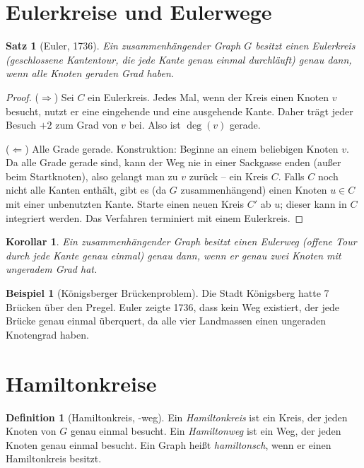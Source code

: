 ﻿\documentclass[a4paper,12pt,openany,oneside]{book}
\theoremstyle{definition}
\newtheorem{definition}{Definition}[chapter]
\newtheorem{beispiel}{Beispiel}[chapter]
\theoremstyle{plain}
\newtheorem{satz}{Satz}[chapter]
\newtheorem{korollar}{Korollar}[chapter]
\theoremstyle{remark}
\begin{document}
\section{Eulerkreise und Eulerwege}

\begin{satz}[Euler, 1736]
  Ein zusammenh\"angender Graph $G$ besitzt einen \emph{Eulerkreis}
  (geschlossene Kantentour, die jede Kante genau einmal durchl\"auft)
  genau dann, wenn alle Knoten geraden Grad haben.
\end{satz}

\begin{proof}
  ($\Rightarrow$) Sei $C$ ein Eulerkreis. Jedes Mal, wenn der Kreis einen
  Knoten $v$ besucht, nutzt er eine eingehende und eine ausgehende Kante.
  Daher tr\"agt jeder Besuch $+2$ zum Grad von $v$ bei. Also ist $\deg(v)$
  gerade.

  ($\Leftarrow$) Alle Grade gerade. Konstruktion: Beginne an einem beliebigen
  Knoten $v$. Da alle Grade gerade sind, kann der Weg nie in einer Sackgasse
  enden (au\ss{}er beim Startknoten), also gelangt man zu $v$ zur\"uck -- ein
  Kreis $C$. Falls $C$ noch nicht alle Kanten enth\"alt, gibt es (da $G$
  zusammenh\"angend) einen Knoten $u \in C$ mit einer unbenutzten Kante.
  Starte einen neuen Kreis $C'$ ab $u$; dieser kann in $C$ integriert werden.
  Das Verfahren terminiert mit einem Eulerkreis.
\end{proof}

\begin{korollar}
  Ein zusammenh\"angender Graph besitzt einen \emph{Eulerweg} (offene Tour
  durch jede Kante genau einmal) genau dann, wenn er genau zwei Knoten mit
  ungeradem Grad hat.
\end{korollar}

\begin{beispiel}[K\"onigsberger Br\"uckenproblem]
  Die Stadt K\"onigsberg hatte 7 Br\"ucken \"uber den Pregel. Euler zeigte
  1736, dass kein Weg existiert, der jede Br\"ucke genau einmal \"uberquert,
  da alle vier Landmassen einen ungeraden Knotengrad haben.
\end{beispiel}

\section{Hamiltonkreise}

\begin{definition}[Hamiltonkreis, -weg]
  Ein \emph{Hamiltonkreis} ist ein Kreis, der jeden Knoten von $G$ genau
  einmal besucht. Ein \emph{Hamiltonweg} ist ein Weg, der jeden Knoten
  genau einmal besucht. Ein Graph hei\ss{}t \emph{hamiltonsch}, wenn er
  einen Hamiltonkreis besitzt.
\end{definition}
\end{document}
